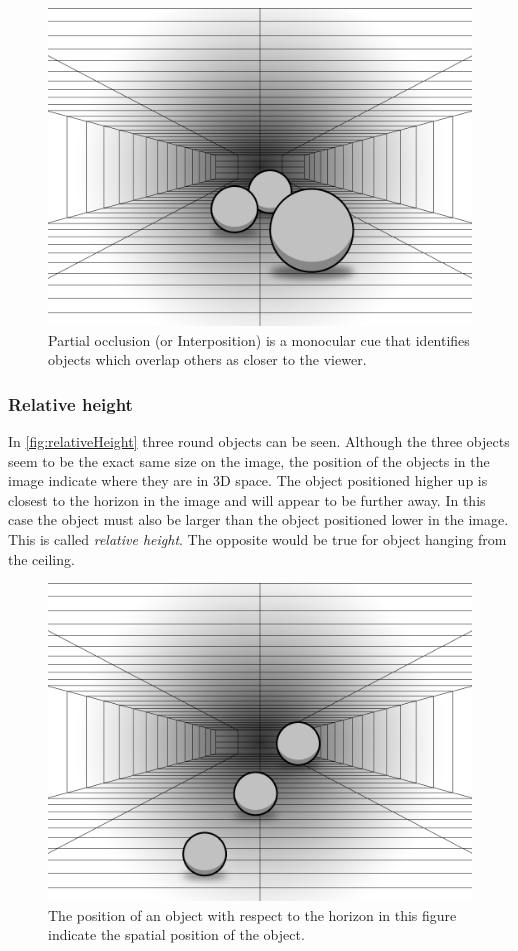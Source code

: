 \begin{figure}[H]
	\centering
	\includegraphics[width=0.8\linewidth]{figure/Analysis/partialOcclusion.png}
	\caption{Partial occlusion (or Interposition) is a monocular cue that identifies objects which overlap others as closer to the viewer.}
	\label{fig:partialOcclusion}
\end{figure}

\subsubsection{Relative height}\label{sec:relativeHeight}
In \autoref{fig:relativeHeight} three round objects can be seen. Although the three objects seem to be the exact same size on the image, the position of the objects in the image indicate where they are in 3D space. The object positioned higher up is closest to the horizon in the image and will appear to be further away. In this case the object must also be larger than the object positioned lower in the image. This is called \textit{relative height}. The opposite would be true for object hanging from the ceiling\citep[p.~198]{sensationPerception}.

\begin{figure}[H]
	\centering
	\includegraphics[width=0.8\linewidth]{figure/Analysis/relativeHeight.png}
	\caption{The position of an object with respect to the horizon in this figure indicate the spatial position of the object.}
	\label{fig:relativeHeight}
\end{figure}

